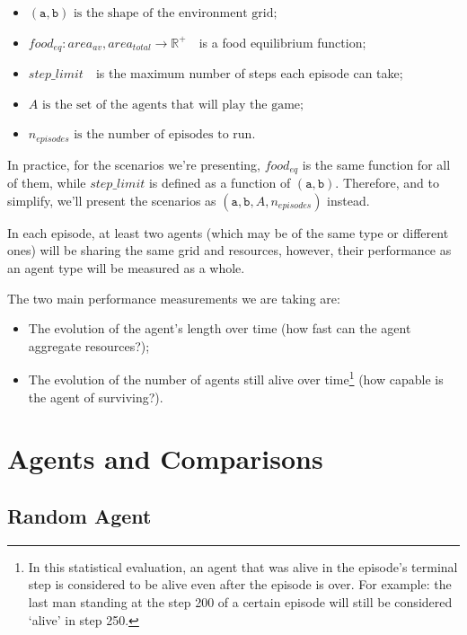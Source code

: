 \begin{itemize}
  \item $(\texttt{a}, \texttt{b}) \text{ is the shape of the environment grid;}$
  \item $food_{eq}: area_{av}, area_{total} \rightarrow \mathbb{R}^+ \text{ }$ is a food equilibrium function;
  \item $step\_limit \text{ }$ is the maximum number of steps each episode can take;
  \item $A \text{ is the set of the agents that will play the game;}$
  \item $n_{episodes} \text{ is the number of episodes to run.}$
\end{itemize}

In practice, for the scenarios we're presenting, $food_{eq}$ is the same function for all of them,
while $step\_limit$ is defined as a function of $(\texttt{a}, \texttt{b})$. Therefore, and to simplify,
we'll present the scenarios as $(\texttt{a},\texttt{b},A,n_{episodes})$ instead.

In each episode, at least two agents (which may be of the same type or different ones) will be sharing the same
grid and resources, however, their performance as an agent type will be measured as a whole.

The two main performance measurements we are taking are:

\begin{itemize}
  \item The evolution of the agent's length over time (how fast can the agent aggregate resources?);
  \item The evolution of the number of agents still alive over time\footnote{
In this statistical evaluation, an agent that was alive in the episode's terminal step is considered to be alive even after the episode is over.
For example: the last man standing at the step 200 of a certain episode will still
be considered `alive' in step 250.} (how capable is the agent of surviving?).
\end{itemize}

\section{Agents and Comparisons}

\subsection{Random Agent}

